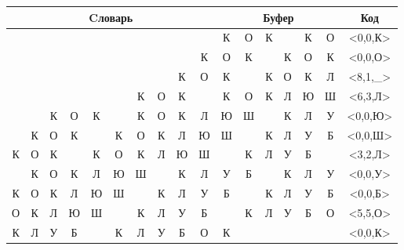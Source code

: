 \documentclass[a4paper, 12pt]{article}
\begin{document}
\begin{table}[h!]
\centering
\begin{tabular}{|c|c|c|c|c|c|c|c|c|c|c|c|c|c|c|c|c|} 
\hline
\multicolumn{10}{|c|}{Cловарь} & \multicolumn{6}{c|}{Буфер} & Код  \\ \hline
  &   &   &   &   &   &   &   &   &   & \cellcolor[HTML]{8CE4F6} К & О & К &   & К & О & <0,0,К>
\\ \hline
  &   &   &   &   &   &   &   &   & К & \cellcolor[HTML]{8CE4F6} О & К &   & К & О & К & <0,0,О>
\\ \hline
  &   &   &   &   &   &   &   & \cellcolor[HTML]{FFFF00} К & О & \cellcolor[HTML]{FFFF00} К & \cellcolor[HTML]{8CE4F6}   & К & О & К & Л & <8,1,\_>
\\ \hline
  &   &   &   &   &   & \cellcolor[HTML]{FFFF00} К & \cellcolor[HTML]{FFFF00} О & \cellcolor[HTML]{FFFF00} К &   & \cellcolor[HTML]{FFFF00} К & \cellcolor[HTML]{FFFF00} О & \cellcolor[HTML]{FFFF00} К & \cellcolor[HTML]{8CE4F6} Л & Ю & Ш & <6,3,Л>
\\ \hline
  &   & К & О & К &   & К & О & К & Л & \cellcolor[HTML]{8CE4F6} Ю & Ш &   & К & Л & У & <0,0,Ю>
\\ \hline
  & К & О & К &   & К & О & К & Л & Ю & \cellcolor[HTML]{8CE4F6} Ш &   & К & Л & У & Б & <0,0,Ш>
\\ \hline
К & О & К & \cellcolor[HTML]{FFFF00}   & \cellcolor[HTML]{FFFF00} К & О & К & Л & Ю & Ш & \cellcolor[HTML]{FFFF00}   & \cellcolor[HTML]{FFFF00} К & \cellcolor[HTML]{8CE4F6} Л & У & Б &   & <3,2,Л>
\\ \hline
  & К & О & К & Л & Ю & Ш &   & К & Л & \cellcolor[HTML]{8CE4F6} У & Б &   & К & Л & У & <0,0,У>
\\ \hline
К & О & К & Л & Ю & Ш &   & К & Л & У & \cellcolor[HTML]{8CE4F6} Б &   & К & Л & У & Б & <0,0,Б>
\\ \hline
О & К & Л & Ю & Ш & \cellcolor[HTML]{FFFF00}   & \cellcolor[HTML]{FFFF00} К & \cellcolor[HTML]{FFFF00} Л & \cellcolor[HTML]{FFFF00} У & \cellcolor[HTML]{FFFF00} Б & \cellcolor[HTML]{FFFF00}   & \cellcolor[HTML]{FFFF00} К & \cellcolor[HTML]{FFFF00} Л & \cellcolor[HTML]{FFFF00} У & \cellcolor[HTML]{FFFF00} Б & \cellcolor[HTML]{8CE4F6} О & <5,5,О>
\\ \hline
К & Л & У & Б &   & К & Л & У & Б & О & \cellcolor[HTML]{8CE4F6} К &   &   &   &   &   & <0,0,К>
\\ \hline
\end{tabular}
\end{table}
\end{document}
